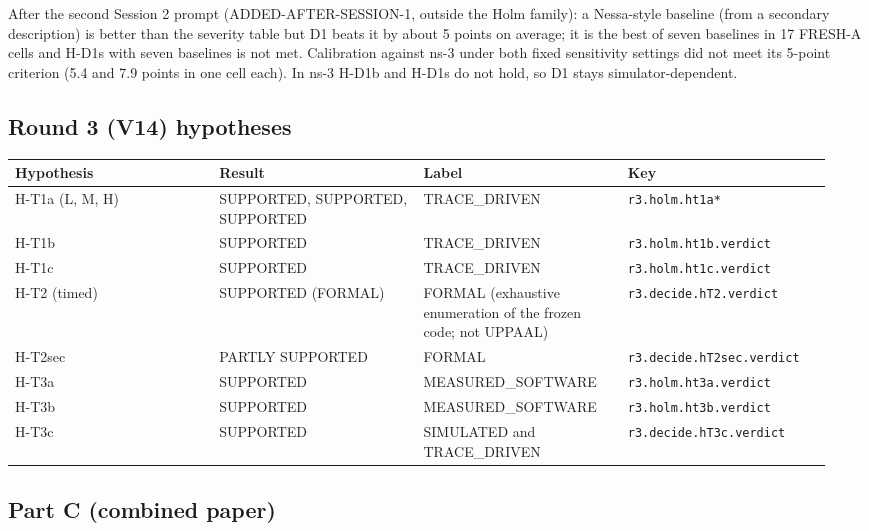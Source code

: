 After the second Session 2 prompt (ADDED-AFTER-SESSION-1, outside the Holm family): a Nessa-style baseline (from a secondary description) is better than the severity table but D1 beats it by about 5 points on average; it is the best of seven baselines in 17 FRESH-A cells and H-D1s with seven baselines is not met. Calibration against ns-3 under both fixed sensitivity settings did not meet its 5-point criterion (5.4 and 7.9 points in one cell each). In ns-3 H-D1b and H-D1s do not hold, so D1 stays simulator-dependent.


\subsection*{Round 3 (V14) hypotheses}

{\scriptsize\raggedright
\begin{longtable}{p{0.237\linewidth}p{0.237\linewidth}p{0.237\linewidth}p{0.237\linewidth}}
\toprule
Hypothesis & Result & Label & Key \\
\midrule
\endhead
H-T1a (L, M, H) & SUPPORTED, SUPPORTED, SUPPORTED & TRACE\_DRIVEN & \texttt{r3.holm.ht1a*} \\
H-T1b & SUPPORTED & TRACE\_DRIVEN & \texttt{r3.holm.ht1b.verdict} \\
H-T1c & SUPPORTED & TRACE\_DRIVEN & \texttt{r3.holm.ht1c.verdict} \\
H-T2 (timed) & SUPPORTED (FORMAL) & FORMAL (exhaustive enumeration of the frozen code; not UPPAAL) & \texttt{r3.decide.hT2.verdict} \\
H-T2sec & PARTLY SUPPORTED & FORMAL & \texttt{r3.decide.hT2sec.verdict} \\
H-T3a & SUPPORTED & MEASURED\_SOFTWARE & \texttt{r3.holm.ht3a.verdict} \\
H-T3b & SUPPORTED & MEASURED\_SOFTWARE & \texttt{r3.holm.ht3b.verdict} \\
H-T3c & SUPPORTED & SIMULATED and TRACE\_DRIVEN & \texttt{r3.decide.hT3c.verdict} \\
\bottomrule
\end{longtable}}



\subsection*{Part C (combined paper)}

